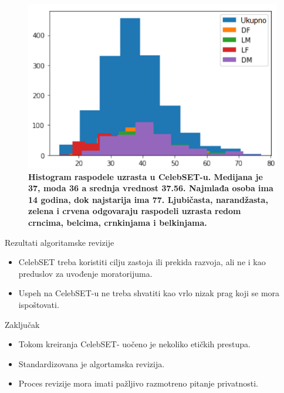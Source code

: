 \documentclass{beamer}
\begin{document}
	\begin{frame}
		\begin{figure}[h!]
			\centerline{\includegraphics[width=0.65\linewidth]{hist.PNG}}
			\caption{\textbf{Histogram raspodele uzrasta u CelebSET-u. Medijana je 37, moda 36 a srednja vrednost 37.56. Najmlađa osoba ima 14 godina, dok najstarija ima 77. \textcolor{cc-purple}{Ljubičasta}, \textcolor{cc-orange}{narandžasta}, \textcolor{cc-green}{zelena} i \textcolor{cc-red}{crvena} odgovaraju raspodeli uzrasta redom crncima, belcima, crnkinjama i belkinjama.}}
		\end{figure}
	\end{frame}

	\begin{frame}{Rezultati algoritamske revizije}
		\begin{itemize}
			\item CelebSET treba koristiti cilju zastoja ili prekida razvoja, ali ne i kao preduslov za uvođenje moratorijuma.
			\bigskip
			\item Uspeh na CelebSET-u ne treba shvatiti kao vrlo nizak prag koji se mora ispoštovati.
		\end{itemize}
	\end{frame}

	\begin{frame}{Zaključak}
		\begin{itemize}
			\item Tokom kreiranja CelebSET- uočeno je nekoliko etičkih prestupa.
			\bigskip
			\item Standardizovana je algortamska revizija.
			\bigskip
			\item Proces revizije mora imati pažljivo razmotreno pitanje privatnosti.
		\end{itemize}
	\end{frame}
\end{document}
